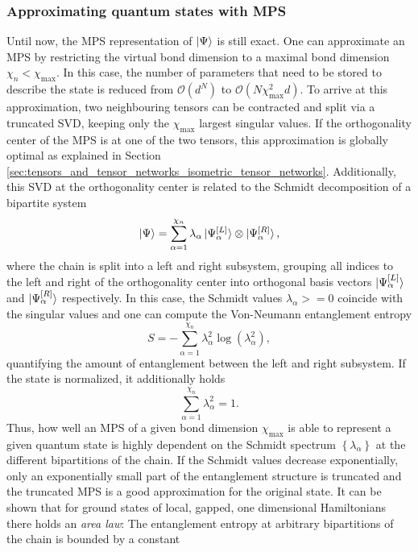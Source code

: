 \subsubsection*{\hspace{95pt}Approximating quantum states with MPS}
Until now, the MPS representation of $\ket{\Psi}$ is still exact. One can approximate an MPS by restricting the virtual bond dimension to a maximal bond dimension $\chi_n < \chi_\text{max}$. In this case, the number of parameters that need to be stored to describe the state is reduced from $\mathcal{O}\left(d^N\right)$ to $\mathcal{O}\left(N\chi_\text{max}^2 d\right)$. To arrive at this approximation, two neighbouring tensors can be contracted and split via a truncated SVD, keeping only the $\chi_\text{max}$ largest singular values. If the orthogonality center of the MPS is at one of the two tensors, this approximation is globally optimal as explained in Section \ref{sec:tensors_and_tensor_networks_isometric_tensor_networks}. Additionally, this SVD at the orthogonality center is related to the Schmidt decomposition of a bipartite system
\begin{equation}
	\ket{\Psi} = \sum_{\alpha=1}^{\chi_n} \lambda_\alpha \ket{\Psi^{[L]}_\alpha} \otimes \ket{\Psi^{[R]}_\alpha},
\end{equation}
where the chain is split into a left and right subsystem, grouping all indices to the left and right of the orthogonality center into orthogonal basis vectors $\ket{\Psi^{[L]}_\alpha}$ and $\ket{\Psi^{[R]}_\alpha}$ respectively. In this case, the Schmidt values $\lambda_\alpha >= 0$ coincide with the singular values \cite{cite:DMRG_in_the_age_of_MPS} and one can compute the Von-Neumann entanglement entropy
\begin{equation}
	S = -\sum_{\alpha=1}^{\chi_n} \lambda_\alpha^2 \log\left(\lambda_\alpha^2\right),
\end{equation}
quantifying the amount of entanglement between the left and right subsystem. If the state is normalized, it additionally holds
\begin{equation}
	\sum_{\alpha=1}^{\chi_n} \lambda_\alpha^2 = 1.
\end{equation}
Thus, how well an MPS of a given bond dimension $\chi_\text{max}$ is able to represent a given quantum state is highly dependent on the Schmidt spectrum $\left\{\lambda_\alpha\right\}$ at the different bipartitions of the chain. If the Schmidt values decrease exponentially, only an exponentially small part of the entanglement structure is truncated and the truncated MPS is a good approximation for the original state. It can be shown \cite{cite:area_law_1D_proof, cite:area_laws_review} that for ground states of local, gapped, one dimensional Hamiltonians there holds an \textit{area law}: The entanglement entropy at arbitrary bipartitions of the chain is bounded by a constant
